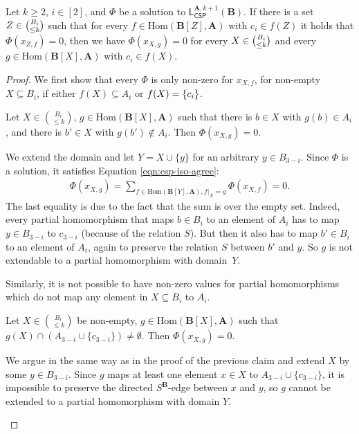 \documentclass[a4paper,english, thm-restate]{lipics-v2021}
\DeclarePairedDelimiter\set{\lbrace}{\rbrace}
\newcommand{\StructA}{\mathbf{A}}
\newcommand{\StructB}{\mathbf{B}}
\newcommand{\Hom}[2]{\mathrm{Hom}(#1,#2)}
\newcommand{\leqs}{\mathsf{L}}
\newcommand{\cspiso}[3]{\leqs^{#1,#2}_{\mathsf{CSP}}(#3)}
\begin{document}
	\begin{lemma}
		\label{lem:fixingIntegerSolutionInOr}
		Let $k \geq 2$, $i \in [2]$, 
		and $\Phi$ be a solution to $\cspiso{\StructA}{k+1}{\StructB}$.
		If there is a set $Z \in \tbinom{B_i}{\leq k}$ such that
		for every $f\in \Hom{\StructB[Z]}{\StructA}$ with $c_i \in f(Z)$
		it holds that
		$\Phi(x_{Z,f}) = 0$, then we have $\Phi(x_{X,g}) = 0$
		for every $X \in \tbinom{B_i}{\leq k}$ and every
		$g\in \Hom{\StructB[X]}{\StructA}$ with $c_i \in f(X)$.
	\end{lemma}
	\begin{proof}
		We first show that every $\Phi$ 
		is only non-zero for $x_{X,f}$, for non-empty $X \subseteq B_i$, if either $f(X) \subseteq A_i$ or $f(X) = \set{c_i}$.
		\begin{claim}
			\label{clm:fixingIntegerSolutionInOr-A}
			Let $X \in \binom{B_i}{\leq k}$, $g \in \Hom{\StructB[X]}{\StructA}$ such that there is $b \in X$ with $g(b) \in A_i$, and there is $b' \in X$ with $g(b') \notin A_i$. Then $\Phi(x_{X,g}) = 0$.
		\end{claim}
		\begin{claimproof}
			We extend the domain and let $Y = X \cup \{y\}$ for an arbitrary $y \in B_{3-i}$. Since $\Phi$ is a solution, it satisfies Equation \ref{eqn:csp-iso-agree}:
			\begin{align*}
				\Phi(x_{X,g}) = \sum_{f \in \Hom{\StructB[Y]}{\StructA}, f|_X = g} \Phi(x_{X,f}) = 0.  
			\end{align*}
			The last equality is due to the fact that the sum is over the empty set.
			Indeed, every partial homomorphism that maps $b \in B_i$ to an element of $A_i$ has to map $y \in B_{3-i}$ to $c_{3-i}$ (because of the relation $S$). But then it also has to map $b' \in B_i$ to an element of $A_i$, again to preserve the relation $S$ between $b'$ and $y$. So $g$ is not extendable to a partial homomorphism with domain~$Y$.
		\end{claimproof}	
		\noindent Similarly, it is not possible to have non-zero values for partial homomorphisms which do not map any element in $X \subseteq B_i$ to $A_i$.
		\begin{claim}
			\label{clm:fixingIntegerSolutionInOr-B}
			Let $X \in \binom{B_i}{\leq k}$ be non-empty, $g \in \Hom{\StructB[X]}{\StructA}$ such that $g(X) \cap (A_{3-i} \cup \{c_{3-i}\}) \neq \emptyset$. Then $\Phi(x_{X,g}) = 0$.
		\end{claim}
		\begin{claimproof}
			We argue in the same way as in the proof of the previous claim and extend $X$ by some $y \in B_{3-i}$. Since $g$ maps at least one element $x \in X$ to $A_{3-i} \cup \{c_{3-i}\}$, it is impossible to preserve the directed $S^{\StructB}$-edge between $x$ and $y$, so $g$ cannot be extended to a partial homomorphism with domain $Y$.

\end{claimproof}
\end{proof}
\end{document}
